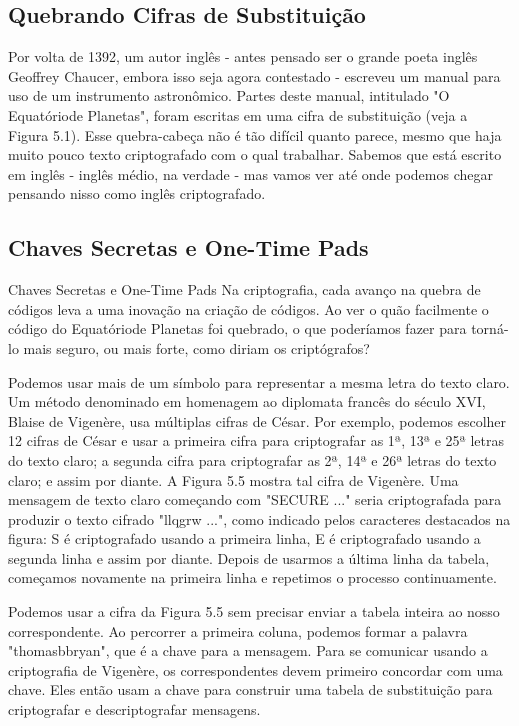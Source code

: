 \documentclass{book}
\begin{document}

\subsection{Quebrando Cifras de Substituição}
\label{segredos:cifras}

Por volta de 1392, um autor inglês - antes pensado ser o grande poeta inglês Geoffrey Chaucer, embora isso seja agora contestado - escreveu um manual para uso de um instrumento astronômico. Partes deste manual, intitulado "O Equatóriode Planetas", foram escritas em uma cifra de substituição (veja a Figura 5.1). Esse quebra-cabeça não é tão difícil quanto parece, mesmo que haja muito pouco texto criptografado com o qual trabalhar. Sabemos que está escrito em inglês - inglês médio, na verdade - mas vamos ver até onde podemos chegar pensando nisso como inglês criptografado.


\subsection{Chaves Secretas e One-Time Pads}
\label{segredos:one-time-pads}

Chaves Secretas e One-Time Pads
Na criptografia, cada avanço na quebra de códigos leva a uma inovação na criação de códigos. Ao ver o quão facilmente o código do Equatóriode Planetas foi quebrado, o que poderíamos fazer para torná-lo mais seguro, ou mais forte, como diriam os criptógrafos?

Podemos usar mais de um símbolo para representar a mesma letra do texto claro. Um método denominado em homenagem ao diplomata francês do século XVI, Blaise de Vigenère, usa múltiplas cifras de César. Por exemplo, podemos escolher 12 cifras de César e usar a primeira cifra para criptografar as 1ª, 13ª e 25ª letras do texto claro; a segunda cifra para criptografar as 2ª, 14ª e 26ª letras do texto claro; e assim por diante. A Figura 5.5 mostra tal cifra de Vigenère. Uma mensagem de texto claro começando com "SECURE ..." seria criptografada para produzir o texto cifrado "llqgrw ...", como indicado pelos caracteres destacados na figura: S é criptografado usando a primeira linha, E é criptografado usando a segunda linha e assim por diante. Depois de usarmos a última linha da tabela, começamos novamente na primeira linha e repetimos o processo continuamente.

Podemos usar a cifra da Figura 5.5 sem precisar enviar a tabela inteira ao nosso correspondente. Ao percorrer a primeira coluna, podemos formar a palavra "thomasbbryan", que é a chave para a mensagem. Para se comunicar usando a criptografia de Vigenère, os correspondentes devem primeiro concordar com uma chave. Eles então usam a chave para construir uma tabela de substituição para criptografar e descriptografar mensagens.
\end{document}
